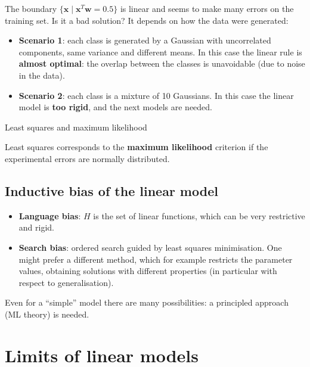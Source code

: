 The boundary \(\{\mathbf{x} \mid \mathbf{x}^T\mathbf{w} = 0.5\}\) is
linear and seems to make many errors on the training set. Is it a bad
solution? It depends on how the data were generated:

\begin{itemize}
\tightlist
\item
  \textbf{Scenario 1}: each class is generated by a Gaussian with
  uncorrelated components, same variance and different means. In this
  case the linear rule is \textbf{almost optimal}: the overlap between
  the classes is unavoidable (due to noise in the data).
\item
  \textbf{Scenario 2}: each class is a mixture of 10 Gaussians. In this
  case the linear model is \textbf{too rigid}, and the next models are
  needed.
\end{itemize}

\begin{boxnote}{Least squares and maximum likelihood}

Least squares corresponds to the \textbf{maximum likelihood} criterion
if the experimental errors are normally distributed.

\end{boxnote}

\subsection{Inductive bias of the linear
model}\label{bias-induttivo-del-modello-lineare}

\begin{itemize}
\tightlist
\item
  \textbf{Language bias}: \(H\) is the set of linear functions, which
  can be very restrictive and rigid.
\item
  \textbf{Search bias}: ordered search guided by least squares
  minimisation. One might prefer a different method, which for example
  restricts the parameter values, obtaining solutions with different
  properties (in particular with respect to generalisation).
\end{itemize}

Even for a ``simple'' model there are many possibilities: a
principled approach (ML theory) is needed.

\section{Limits of linear models}\label{limiti-dei-modelli-lineari}

